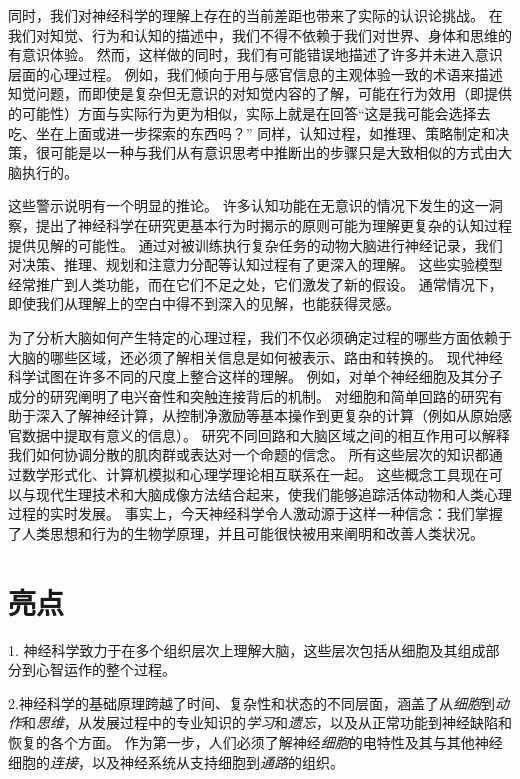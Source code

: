 同时，我们对神经科学的理解上存在的当前差距也带来了实际的认识论挑战。
在我们对知觉、行为和认知的描述中，我们不得不依赖于我们对世界、身体和思维的有意识体验。
然而，这样做的同时，我们有可能错误地描述了许多并未进入意识层面的心理过程。
例如，我们倾向于用与感官信息的主观体验一致的术语来描述知觉问题，而即使是复杂但无意识的对知觉内容的了解，可能在行为效用（即提供的可能性）方面与实际行为更为相似，实际上就是在回答“这是我可能会选择去吃、坐在上面或进一步探索的东西吗？”
同样，认知过程，如推理、策略制定和决策，很可能是以一种与我们从有意识思考中推断出的步骤只是大致相似的方式由大脑执行的。





这些警示说明有一个明显的推论。
许多认知功能在无意识的情况下发生的这一洞察，提出了神经科学在研究更基本行为时揭示的原则可能为理解更复杂的认知过程提供见解的可能性。
通过对被训练执行复杂任务的动物大脑进行神经记录，我们对决策、推理、规划和注意力分配等认知过程有了更深入的理解。
这些实验模型经常推广到人类功能，而在它们不足之处，它们激发了新的假设。
通常情况下，即使我们从理解上的空白中得不到深入的见解，也能获得灵感。


为了分析大脑如何产生特定的心理过程，我们不仅必须确定过程的哪些方面依赖于大脑的哪些区域，还必须了解相关信息是如何被表示、路由和转换的。
现代神经科学试图在许多不同的尺度上整合这样的理解。
例如，对单个神经细胞及其分子成分的研究阐明了电兴奋性和突触连接背后的机制。
对细胞和简单回路的研究有助于深入了解神经计算，从控制净激励等基本操作到更复杂的计算（例如从原始感官数据中提取有意义的信息）。
研究不同回路和大脑区域之间的相互作用可以解释我们如何协调分散的肌肉群或表达对一个命题的信念。
所有这些层次的知识都通过数学形式化、计算机模拟和心理学理论相互联系在一起。
这些概念工具现在可以与现代生理技术和大脑成像方法结合起来，使我们能够追踪活体动物和人类心理过程的实时发展。
事实上，今天神经科学令人激动源于这样一种信念：我们掌握了人类思想和行为的生物学原理，并且可能很快被用来阐明和改善人类状况。






\section{亮点}

1. 神经科学致力于在多个组织层次上理解大脑，这些层次包括从细胞及其组成部分到心智运作的整个过程。


2.神经科学的基础原理跨越了时间、复杂性和状态的不同层面，涵盖了从\textit{细胞}到\textit{动作}和\textit{思维}，从发展过程中的专业知识的\textit{学习}和\textit{遗忘}，以及从正常功能到神经缺陷和恢复的各个方面。
作为第一步，人们必须了解神经\textit{细胞}的电特性及其与其他神经细胞的\textit{连接}，以及神经系统从支持细胞到\textit{通路}的组织。


